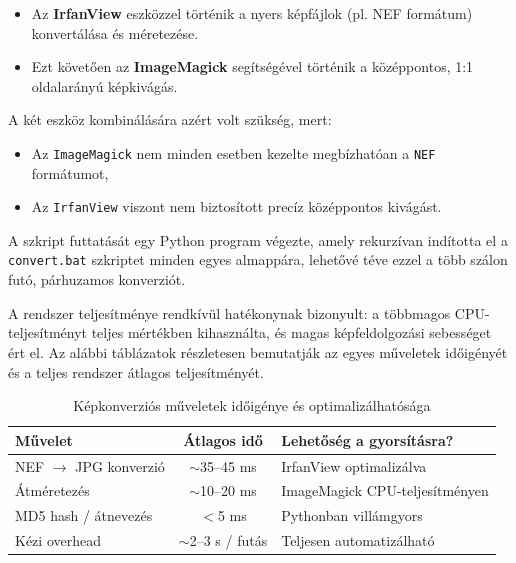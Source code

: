 \documentclass[	
  noindent
]{elteikthesis}[2024/04/26]
\begin{document}
      \begin{itemize}
        \item Az \textbf{IrfanView} eszközzel történik a nyers képfájlok (pl. NEF formátum) konvertálása és méretezése.
        \item Ezt követően az \textbf{ImageMagick} segítségével történik a középpontos, 1:1 oldalarányú képkivágás.
      \end{itemize}
      
      A két eszköz kombinálására azért volt szükség, mert:
      \begin{itemize}
        \item Az \texttt{ImageMagick} nem minden esetben kezelte megbízhatóan a \texttt{NEF} formátumot,
        \item Az \texttt{IrfanView} viszont nem biztosított precíz középpontos kivágást.
      \end{itemize}
      
      A szkript futtatását egy Python program végezte, amely rekurzívan indította el a \texttt{convert.bat} szkriptet minden egyes almappára, lehetővé téve ezzel a több szálon futó, párhuzamos konverziót.
      
      A rendszer teljesítménye rendkívül hatékonynak bizonyult: a többmagos CPU-teljesítményt teljes mértékben kihasználta, és magas képfeldolgozási sebességet ért el. Az alábbi táblázatok részletesen bemutatják az egyes műveletek időigényét és a teljes rendszer átlagos teljesítményét.
      
      \vspace{1em}
      \begin{table}[H]
      \centering
      \caption{Képkonverziós műveletek időigénye és optimalizálhatósága}
      \begin{tabular}{|l|c|l|}
      \hline
      \textbf{Művelet} & \textbf{Átlagos idő} & \textbf{Lehetőség a gyorsításra?} \\
      \hline
      NEF $\rightarrow$ JPG konverzió & $\sim$35–45 ms & IrfanView optimalizálva \\
      Átméretezés & $\sim$10–20 ms & ImageMagick CPU-teljesítményen \\
      MD5 hash / átnevezés & $<$5 ms & Pythonban villámgyors \\
      Kézi overhead & $\sim$2–3 s / futás & Teljesen automatizálható \\
      \hline
      \end{tabular}
      \end{table}
      
\end{document}
